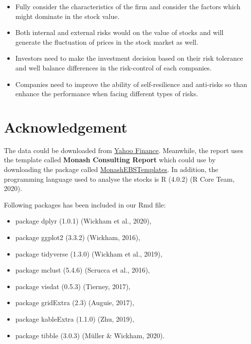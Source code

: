 \documentclass[11pt,a4paper,]{article}
\providecommand{\tightlist}{%
  \setlength{\itemsep}{0pt}\setlength{\parskip}{0pt}}
\begin{document}
\begin{itemize}
\tightlist
\item
  Fully consider the characteristics of the firm and consider the factors which might dominate in the stock value.
\item
  Both internal and external risks would on the value of stocks and will generate the fluctuation of prices in the stock market as well.
\item
  Investors need to make the investment decision based on their risk tolerance and well balance differences in the risk-control of each companies.
\item
  Companies need to improve the ability of self-resilience and anti-risks so than enhance the performance when facing different types of risks.
\end{itemize}

\hypertarget{acknowledgement}{%
\section{Acknowledgement}\label{acknowledgement}}

The data could be downloaded from \href{https://au.finance.yahoo.com/}{Yahoo Finance}. Meanwhile, the report uses the template called \textbf{Monash Consulting Report} which could use by downloading the package called \href{https://github.com/robjhyndman/MonashEBSTemplates}{MonashEBSTemplates}. In addition, the programming language used to analyse the stocks is R (4.0.2) (R Core Team, 2020).

Following packages has been included in our Rmd file:

\begin{itemize}
\tightlist
\item
  package dplyr (1.0.1) (Wickham et al., 2020),
\item
  package ggplot2 (3.3.2) (Wickham, 2016),
\item
  package tidyverse (1.3.0) (Wickham et al., 2019),
\item
  package mclust (5.4.6) (Scrucca et al., 2016),
\item
  package visdat (0.5.3) (Tierney, 2017),
\item
  package gridExtra (2.3) (Auguie, 2017),
\item
  package kableExtra (1.1.0) (Zhu, 2019),
\item
  package tibble (3.0.3) (Müller \& Wickham, 2020).
\end{itemize}
\end{document}
